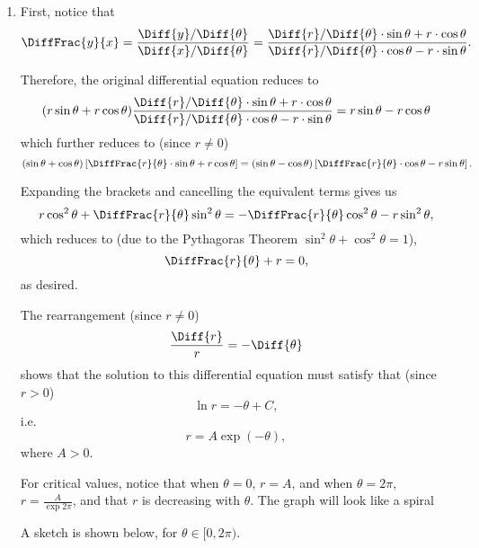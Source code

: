 \Question{\currfilebase}

\begin{enumerate}
    \item First, notice that
          \[
              \DiffFrac{y}{x} = \frac{\Diff{y} / \Diff{\theta}}{\Diff{x} / \Diff{\theta}} = \frac{\Diff{r} / \Diff{\theta} \cdot \sin \theta + r \cdot \cos \theta}{\Diff{r} / \Diff{\theta} \cdot \cos \theta - r \cdot \sin \theta}.
          \]

          Therefore, the original differential equation reduces to
          \[
              (r \sin \theta + r \cos \theta) \frac{\Diff{r} / \Diff{\theta} \cdot \sin \theta + r \cdot \cos \theta}{\Diff{r} / \Diff{\theta} \cdot \cos \theta - r \cdot \sin \theta} = r \sin \theta - r \cos \theta
          \]
          which further reduces to (since \(r \neq 0\))
          \[
              (\sin \theta + \cos \theta) \left[\DiffFrac{r}{\theta} \cdot \sin \theta + r \cos \theta\right] = (\sin \theta - \cos \theta) \left[\DiffFrac{r}{\theta} \cdot \cos \theta - r \sin \theta\right].
          \]

          Expanding the brackets and cancelling the equivalent terms gives us
          \[
              r \cos^2 \theta + \DiffFrac{r}{\theta}\sin^2\theta = - \DiffFrac{r}{\theta} \cos^2 \theta - r \sin^2 \theta,
          \]
          which reduces to (due to the Pythagoras Theorem \(\sin^2 \theta + \cos^2 \theta = 1\)),
          \[
              \DiffFrac{r}{\theta} + r = 0,
          \]
          as desired.

          The rearrangement (since \(r \neq 0\))
          \[
              \frac{\Diff{r}}{r} = - \Diff{\theta}
          \]
          shows that the solution to this differential equation must satisfy that (since \(r > 0\))
          \[
              \ln r = - \theta + C,
          \]
          i.e.
          \[
              r = A \exp (- \theta),
          \]
          where \(A > 0\).

          For critical values, notice that when \(\theta = 0\), \(r = A\), and when \(\theta = 2\pi\), \(r = \frac{A}{\exp 2\pi}\), and that \(r\) is decreasing with \(\theta\). The graph will look like a spiral

          A sketch is shown below, for \(\theta \in [0, 2\pi)\).

          \begin{center}
              
          \end{center}


\end{enumerate}
